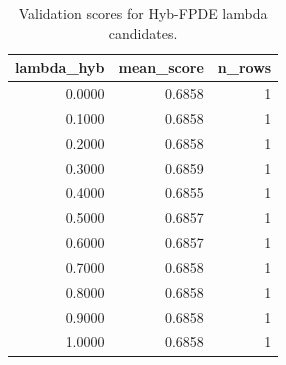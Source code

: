 \begin{table}[t]
\caption{Validation scores for Hyb-FPDE lambda candidates.}
\label{tab:lambda_distribution_computed}
\centering
\begin{tabular}{rrr}
\toprule
lambda\_hyb & mean\_score & n\_rows \\
\midrule
0.0000 & 0.6858 & 1 \\
0.1000 & 0.6858 & 1 \\
0.2000 & 0.6858 & 1 \\
0.3000 & 0.6859 & 1 \\
0.4000 & 0.6855 & 1 \\
0.5000 & 0.6857 & 1 \\
0.6000 & 0.6857 & 1 \\
0.7000 & 0.6858 & 1 \\
0.8000 & 0.6858 & 1 \\
0.9000 & 0.6858 & 1 \\
1.0000 & 0.6858 & 1 \\
\bottomrule
\end{tabular}

\end{table}
